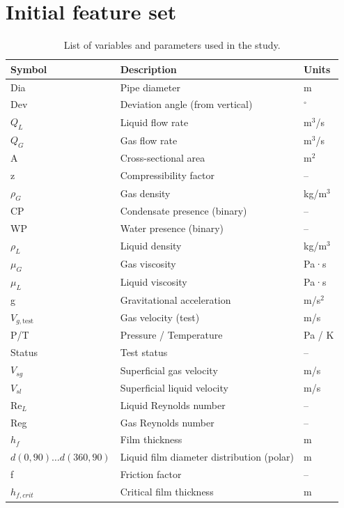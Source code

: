 \documentclass[article.tex]{subfiles}
\begin{document}
\section{Initial feature set}
\begin{table}[H]
\centering
\caption{List of variables and parameters used in the study.}
\label{tab:variables}
\begin{tabular}{lll}
\hline
\textbf{Symbol} & \textbf{Description} & \textbf{Units} \\
\hline
Dia & Pipe diameter & m \\
Dev & Deviation angle (from vertical) & $^\circ$ \\
$Q_L$ & Liquid flow rate & m$^3$/s \\
$Q_G$ & Gas flow rate & m$^3$/s \\
A & Cross-sectional area & m$^2$ \\
z & Compressibility factor & -- \\
$\rho_G$ & Gas density & kg/m$^3$ \\
CP & Condensate presence (binary) & -- \\
WP & Water presence (binary) & -- \\
$\rho_L$ & Liquid density & kg/m$^3$ \\
$\mu_G$ & Gas viscosity & Pa·s \\
$\mu_L$ & Liquid viscosity & Pa·s \\
g & Gravitational acceleration & m/s$^2$ \\
$V_{g,\text{test}}$ & Gas velocity (test) & m/s \\
P/T & Pressure / Temperature & Pa / K \\
Status & Test status & -- \\
$V_{sg}$ & Superficial gas velocity & m/s \\
$V_{sl}$ & Superficial liquid velocity & m/s \\
Re$_L$ & Liquid Reynolds number & -- \\
Reg & Gas Reynolds number & -- \\
$h_f$ & Film thickness & m \\
$d(0,90)\ldots d(360,90)$ & Liquid film diameter distribution (polar) & m \\
f & Friction factor & -- \\
$h_{f,crit}$ & Critical film thickness & m \\
\hline
\end{tabular}
\end{table}
\end{document}
